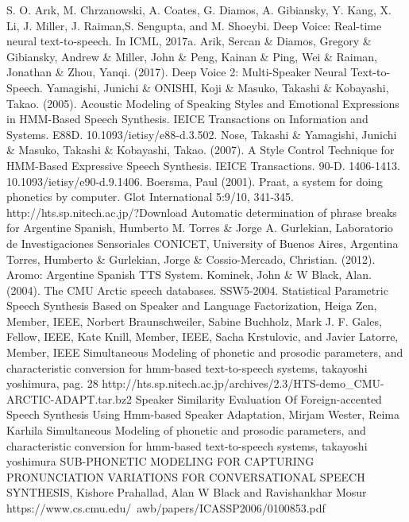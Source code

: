 \begin{thebibliography}{9}
 S. O. Arık, M. Chrzanowski, A. Coates, G. Diamos, A. Gibiansky, Y. Kang, X. Li, J. Miller, J. Raiman,S. Sengupta, and M. Shoeybi. Deep Voice: Real-time neural text-to-speech. In ICML, 2017a.
 Arik, Sercan \& Diamos, Gregory \& Gibiansky, Andrew \& Miller, John \& Peng, Kainan \& Ping, Wei \& Raiman, Jonathan \& Zhou, Yanqi. (2017). Deep Voice 2: Multi-Speaker Neural Text-to-Speech. 
 Yamagishi, Junichi \& ONISHI, Koji \& Masuko, Takashi \& Kobayashi, Takao. (2005). Acoustic Modeling of Speaking Styles and Emotional Expressions in HMM-Based Speech Synthesis. IEICE Transactions on Information and Systems. E88D. 10.1093/ietisy/e88-d.3.502. 
 Nose, Takashi \& Yamagishi, Junichi \& Masuko, Takashi \& Kobayashi, Takao. (2007). A Style Control Technique for HMM-Based Expressive Speech Synthesis. IEICE Transactions. 90-D. 1406-1413. 10.1093/ietisy/e90-d.9.1406. 
 Boersma, Paul (2001). Praat, a system for doing phonetics by computer. Glot International 5:9/10, 341-345.
 http://hts.sp.nitech.ac.jp/?Download
 Automatic determination of phrase breaks for Argentine Spanish, Humberto M. Torres \& Jorge A. Gurlekian, Laboratorio de Investigaciones Sensoriales CONICET, University of Buenos Aires, Argentina
 Torres, Humberto \& Gurlekian, Jorge \& Cossio-Mercado, Christian. (2012). Aromo: Argentine Spanish TTS System.
 Kominek, John \& W Black, Alan. (2004). The CMU Arctic speech databases. SSW5-2004.
 Statistical Parametric Speech Synthesis Based on Speaker and Language Factorization, Heiga Zen, Member, IEEE, Norbert Braunschweiler, Sabine Buchholz, Mark J. F. Gales, Fellow, IEEE, Kate Knill, Member, IEEE, Sacha Krstulovic, and Javier Latorre, Member, IEEE
 Simultaneous Modeling of phonetic and prosodic parameters, and characteristic conversion for hmm-based text-to-speech systems, takayoshi yoshimura, pag. 28
 http://hts.sp.nitech.ac.jp/archives/2.3/HTS-demo\_CMU-ARCTIC-ADAPT.tar.bz2
 Speaker Similarity Evaluation Of Foreign-accented Speech Synthesis Using Hmm-based Speaker Adaptation, Mirjam Wester, Reima Karhila
 Simultaneous Modeling of phonetic and prosodic parameters, and characteristic conversion for hmm-based text-to-speech systems, takayoshi yoshimura
 SUB-PHONETIC MODELING FOR CAPTURING PRONUNCIATION VARIATIONS FOR CONVERSATIONAL SPEECH SYNTHESIS, Kishore Prahallad, Alan W Black and Ravishankhar Mosur https://www.cs.cmu.edu/~awb/papers/ICASSP2006/0100853.pdf

\end{thebibliography}
